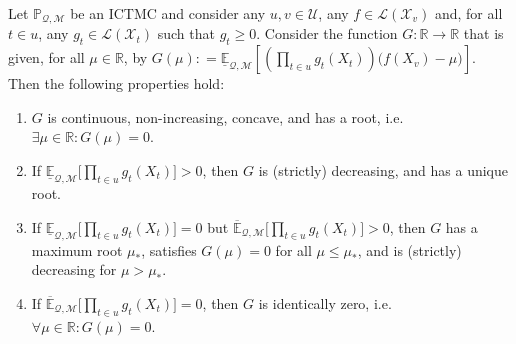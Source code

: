 \documentclass[twoside,11pt]{article}
\makeatletter
\newcommand{\reals}{\mathbb{R}}
\newcommand{\states}{\mathcal{X}}
\newcommand{\lexp}{\underline{\mathbb{E}}_{\rateset,\mathcal{M}}}
\newcommand{\uexp}{\overline{\mathbb{E}}_{\rateset,\mathcal{M}}}
\newcommand{\gambles}{\mathcal{L}}
\newcommand{\rateset}{\mathcal{Q}}
\newcommand{\coloneqq}{:\!=}
\newcommand{\customlabel}[2]{%
   \protected@write \@auxout {}{\string \newlabel {#1}{{#2}{\thepage}{#2}{#1}{}} }%
   \hypertarget{#1}{\emph{#2}\!}
}
\makeatother
\begin{document}
\begin{proposition}\label{prop:GBR_properties}
Let $\mathbb{P}_{\rateset,\mathcal{M}}$ be an ICTMC and consider any $u,v\in\mathcal{U}$, any $f\in\gambles(\states_v)$ and, for all $t\in u$, any $g_{t}\in\gambles(\states_{t})$ such that $g_{t}\geq 0$. 
Consider the function $G: \reals\to\reals$ that is given, for all $\mu\in\reals$, by $G(\mu)\coloneqq \lexp\left[\left(\prod_{t\in u} g_{t}(X_{t})\right)\bigl(f(X_v) - \mu\bigr)\right]$.
%
%
%
Then the following properties hold: \vspace{-2pt}
\begin{enumerate}[label=G\arabic*:,ref=G\arabic*]
\item $G$ is continuous, non-increasing, concave, and has a root, i.e. $\exists \mu\in\reals:G(\mu)=0$. \label{GBR:always} \vspace{-3pt}
\item If\/ $\lexp\bigl[\prod_{t\in u} g_{t}(X_{t})\bigr] >0$, then $G$ is (strictly) decreasing, and has a unique root. \label{GBR:low_pos} \vspace{-3pt}
\item If\/ $\lexp\bigl[\prod_{t\in u} g_{t}(X_{t})\bigr]=0$ but $\uexp\bigl[\prod_{t\in u} g_{t}(X_{t})\bigr] >0$, then $G$ has a maximum root $\mu_*$, satisfies $G(\mu)=0$ for all $\mu\leq \mu_*$, and is (strictly) decreasing for $\mu>\mu_*$. \label{GBR:up_pos} \vspace{-3pt}
\item If\/ $\uexp\bigl[\prod_{t\in u} g_{t}(X_{t})\bigr]=0$, then $G$ is identically zero, i.e. $\forall \mu\in\reals: G(\mu)=0$. \label{GBR:none_pos}
\end{enumerate}


\end{proposition}
\end{document}
